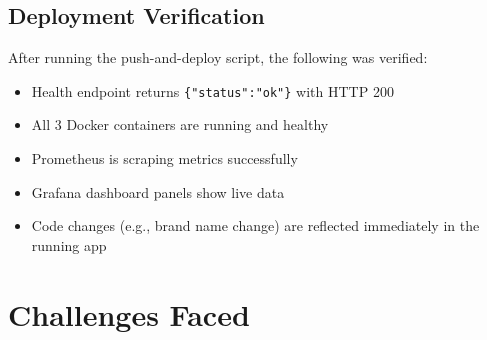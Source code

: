 \documentclass[12pt,a4paper]{article}
\begin{document}
\subsection{Deployment Verification}
After running the push-and-deploy script, the following was verified:

\begin{itemize}[nosep]
    \item Health endpoint returns \texttt{\{"status":"ok"\}} with HTTP 200
    \item All 3 Docker containers are running and healthy
    \item Prometheus is scraping metrics successfully
    \item Grafana dashboard panels show live data
    \item Code changes (e.g., brand name change) are reflected immediately in the running app
\end{itemize}

\begin{center}
\end{center}

\begin{center}
\end{center}

\section{Challenges Faced}
\end{document}
